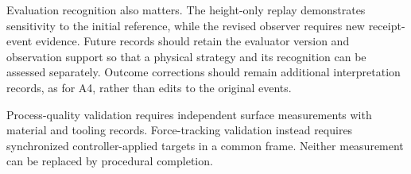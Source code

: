 Evaluation recognition also matters. The height-only replay demonstrates sensitivity to the initial reference, while the revised observer requires new receipt-event evidence. Future records should retain the evaluator version and observation support so that a physical strategy and its recognition can be assessed separately. Outcome corrections should remain additional interpretation records, as for A4, rather than edits to the original events.

Process-quality validation requires independent surface measurements with material and tooling records. Force-tracking validation instead requires synchronized controller-applied targets in a common frame. Neither measurement can be replaced by procedural completion.
